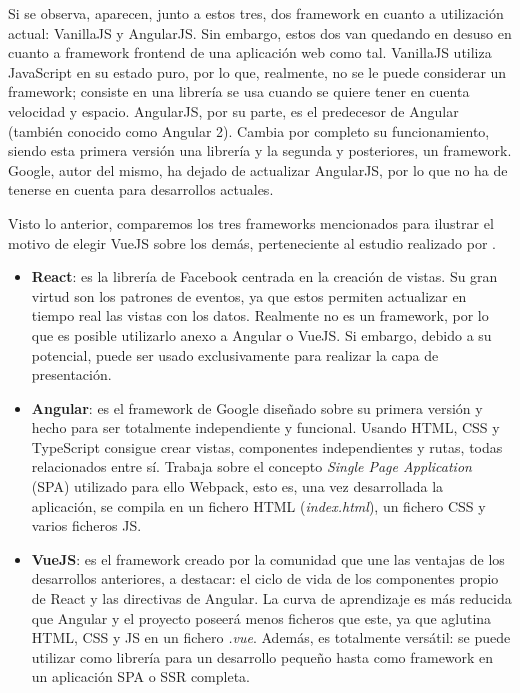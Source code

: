 Si se observa, aparecen, junto a estos tres, dos framework en cuanto a utilización actual: VanillaJS y AngularJS. Sin embargo, estos dos van quedando en desuso en cuanto a framework frontend de una aplicación web como tal. VanillaJS utiliza JavaScript en su estado puro, por lo que, realmente, no se le puede considerar un framework; consiste en una librería se usa cuando se quiere tener en cuenta velocidad y espacio. AngularJS, por su parte, es el predecesor de Angular (también conocido como Angular 2). Cambia por completo su funcionamiento, siendo esta primera versión una librería y la segunda y posteriores, un framework. Google, autor del mismo, ha dejado de actualizar AngularJS, por lo que no ha de tenerse en cuenta para desarrollos actuales.

Visto lo anterior, comparemos los tres frameworks mencionados para ilustrar el motivo de elegir VueJS sobre los demás, perteneciente al estudio realizado por .

\begin{itemize}
    \item \textbf{React}: es la librería de Facebook centrada en la creación de vistas. Su gran virtud son los patrones de eventos, ya que estos permiten actualizar en tiempo real las vistas con los datos. Realmente no es un framework, por lo que es posible utilizarlo anexo a Angular o VueJS. Si embargo, debido a su potencial, puede ser usado exclusivamente para realizar la capa de presentación.
    \item \textbf{Angular}: es el framework de Google diseñado sobre su primera versión y hecho para ser totalmente independiente y funcional. Usando HTML, CSS y TypeScript consigue crear vistas, componentes independientes y rutas, todas relacionados entre sí. Trabaja sobre el concepto \textit{Single Page Application} (SPA) utilizado para ello Webpack, esto es, una vez desarrollada la aplicación, se compila en un fichero HTML (\textit{index.html}), un fichero CSS y varios ficheros JS.
    \item \textbf{VueJS}: es el framework creado por la comunidad que une las ventajas de los desarrollos anteriores, a destacar: el ciclo de vida de los componentes propio de React y las directivas de Angular. La curva de aprendizaje es más reducida que Angular y el proyecto poseerá menos ficheros que este, ya que aglutina HTML, CSS y JS en un fichero \textit{.vue}. Además, es totalmente versátil: se puede utilizar como librería para un desarrollo pequeño hasta como framework en un aplicación SPA o SSR completa.
\end{itemize}

